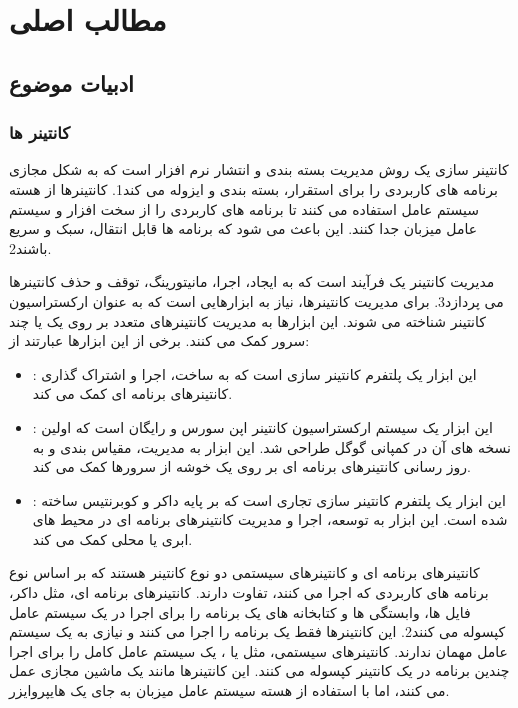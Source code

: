 
\chapter{مطالب اصلی}
\section{ادبیات موضوع}
\subsection{کانتینر ها}

کانتینر سازی یک روش مدیریت بسته بندی و انتشار نرم افزار است که به شکل مجازی برنامه های کاربردی را برای استقرار، بسته بندی و ایزوله می کند1. کانتینرها از هسته سیستم عامل استفاده می کنند تا برنامه های کاربردی را از سخت افزار و سیستم عامل میزبان جدا کنند. این باعث می شود که برنامه ها قابل انتقال، سبک و سریع باشند2.

مدیریت کانتینر یک فرآیند است که به ایجاد، اجرا، مانیتورینگ، توقف و حذف کانتینرها می پردازد3. برای مدیریت کانتینرها، نیاز به ابزارهایی است که به عنوان ارکستراسیون کانتینر شناخته می شوند. این ابزارها به مدیریت کانتینرهای متعدد بر روی یک یا چند سرور کمک می کنند. برخی از این ابزارها عبارتند از:
\begin{itemize}[label=-]
\item
{}: این ابزار یک پلتفرم کانتینر سازی است که به ساخت، اجرا و اشتراک گذاری کانتینرهای برنامه ای کمک می کند.
\item
{}: این ابزار یک سیستم ارکستراسیون کانتینر اپن سورس و رایگان است که اولین نسخه های آن در کمپانی گوگل طراحی شد. این ابزار به مدیریت، مقیاس بندی و به روز رسانی کانتینرهای برنامه ای بر روی یک خوشه از سرورها کمک می کند.
\item
{}: این ابزار یک پلتفرم کانتینر سازی تجاری است که بر پایه داکر و کوبرنتیس ساخته شده است. این ابزار به توسعه، اجرا و مدیریت کانتینرهای برنامه ای در محیط های ابری یا محلی کمک می کند.
\end{itemize}
کانتینرهای برنامه ای و کانتینرهای سیستمی دو نوع کانتینر هستند که بر اساس نوع برنامه های کاربردی که اجرا می کنند، تفاوت دارند. کانتینرهای برنامه ای، مثل داکر، فایل ها، وابستگی ها و کتابخانه های یک برنامه را برای اجرا در یک سیستم عامل کپسوله می کنند2. این کانتینرها فقط یک برنامه را اجرا می کنند و نیازی به یک سیستم عامل مهمان ندارند. کانتینرهای سیستمی، مثل  یا ، یک سیستم عامل کامل را برای اجرا چندین برنامه در یک کانتینر کپسوله می کنند. این کانتینرها مانند یک ماشین مجازی عمل می کنند، اما با استفاده از هسته سیستم عامل میزبان به جای یک هایپروایزر.

